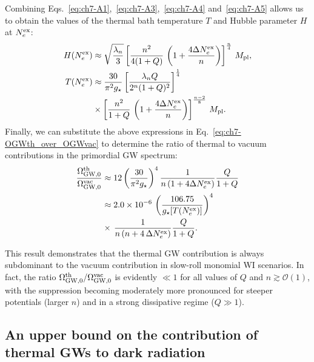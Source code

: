 Combining Eqs.~\eqref{eq:ch7-A1},~\eqref{eq:ch7-A3},~\eqref{eq:ch7-A4} and~\eqref{eq:ch7-A5} allows us to obtain the values of the thermal bath temperature $T$ and Hubble parameter $H$ at $N_e^{\rm ex}$:
\begin{align}
    H(N_e^{\rm ex})&\approx \sqrt{\frac{\lambda_n}{3}}\left[\frac{n^2}{4(1+Q)}\,\left(1+\frac{4\Delta N_e^{\rm ex}}{n}\right)\right]^{\frac{n}{4}}\,M_{\rm pl}, \label{eq:ch7-A6}\\
    T(N_e^{\rm ex})&\approx \frac{30}{\pi^2g_\star}\left[\frac{\lambda_n Q}{2^n(1+Q)^2}\right]^{\frac{1}{4}}\nonumber\\
    &\times \left[\frac{n^2}{1+Q}\,\left(1+\frac{4\Delta N_e^{\rm ex}}{n}\right)\right]^{\frac{n-2}{8}}\,M_{\rm pl}. \label{eq:ch7-A7}
\end{align}
Finally, we can substitute the above expressions in Eq.~\eqref{eq:ch7-OGWth_over_OGWvac} to determine the ratio of thermal to vacuum contributions in the primordial GW spectrum:
\begin{align}
    \frac{\Omega_{\rm GW,0}^{\rm th}}{\Omega_{\rm GW,0}^{\rm vac}}&\approx 12\left(\frac{30}{\pi^2 g_\star}\right)^4\frac{1}{n\left(1+4\Delta N_e^{\rm ex}\right)}\frac{Q}{1+Q} \\
    &\approx 2.0\times 10^{-6}\, \left( \frac{106.75}{g_\star[T(N_e^{\rm ex})]}\right)^4 \nonumber \\
    &\times\,\frac{1}{n\left(n+4\,\Delta N_e^{\rm ex}\right)}\frac{Q}{1+Q}.
\end{align}

This result demonstrates that the thermal GW contribution is always subdominant to the vacuum contribution in slow-roll monomial WI scenarios. In fact, the ratio $\Omega_{\rm GW,0}^{\rm th}/\Omega_{\rm GW,0}^{\rm vac}$ is evidently $\ll 1$ for all values of $Q$ and $n \gtrsim \mathcal{O}(1)$, with the suppression becoming moderately more pronounced for steeper potentials (larger $n$) and in a strong dissipative regime ($Q\gg 1$).


\subsection{An upper bound on the contribution of thermal GWs to dark radiation}\label{sec:ch7-A2}

